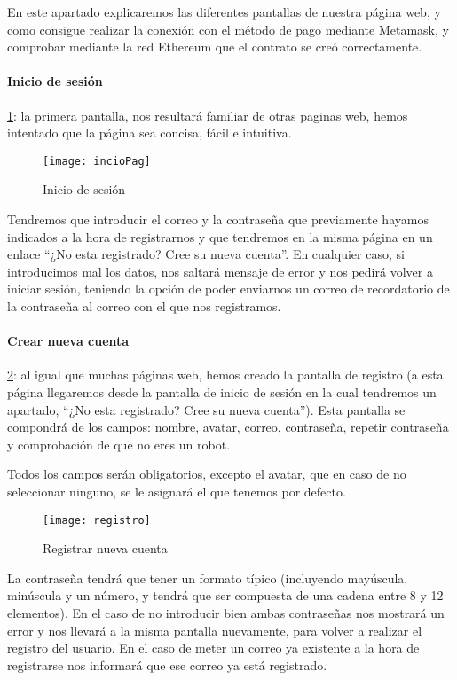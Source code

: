 En este apartado explicaremos las diferentes pantallas de nuestra página web, y como consigue realizar la conexión con el método de pago mediante Metamask, y comprobar mediante la red Ethereum que el contrato se creó correctamente.

\paragraph{Inicio de sesión}\ref{fig:inicio}: la primera pantalla, nos resultará familiar de otras paginas web, hemos intentado que la página sea concisa, fácil e intuitiva. 

\begin{figure}[H]
    \centering
    \texttt{[image: incioPag]}
    \caption{Inicio de sesión}
    \label{fig:inicio}
\end{figure}

Tendremos que introducir el correo y la contraseña que previamente hayamos indicados a la hora de registrarnos y que tendremos en la misma página en un enlace ``¿No esta registrado? Cree su nueva cuenta''. En cualquier caso, si introducimos mal los datos, nos saltará mensaje de error y nos pedirá volver a iniciar sesión, teniendo la opción de poder enviarnos un correo de recordatorio de la contraseña al correo con el que nos registramos.

\paragraph{Crear nueva cuenta} \ref{fig:registro}: al igual que muchas páginas web, hemos creado la pantalla de registro (a esta página llegaremos desde la pantalla de inicio de sesión en la cual tendremos un apartado, ``¿No esta registrado? Cree su nueva cuenta''). Esta pantalla se compondrá de los campos: nombre, avatar, correo, contraseña, repetir contraseña y comprobación de que no eres un robot.

Todos los campos serán obligatorios, excepto el avatar, que en caso de no seleccionar ninguno, se le asignará el que tenemos por defecto.

\begin{figure}[h!]
    \centering
    \texttt{[image: registro]}
    \caption{Registrar nueva cuenta}
    \label{fig:registro}
\end{figure}

La contraseña tendrá que tener un formato típico (incluyendo mayúscula, minúscula y un número, y tendrá que ser compuesta de una cadena entre 8 y 12 elementos). En el caso de no introducir bien ambas contraseñas nos mostrará un error y nos llevará a la misma pantalla nuevamente, para volver a realizar el registro del usuario. En el caso de meter un correo ya existente a la hora de registrarse nos informará que ese correo ya está registrado. 

